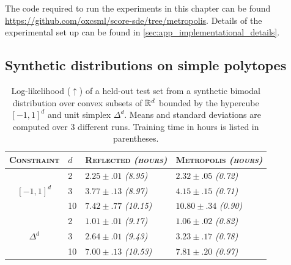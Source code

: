 The code required to run the experiments in this chapter can be found \url{https://github.com/oxcsml/score-sde/tree/metropolis}.
Details of the experimental set up can be found in \cref{sec:app_implementational_details}.

\subsection{Synthetic distributions on simple polytopes}
\label{sec:exp_synthetic_tasks}

\begin{table}
	\caption{
		Log-likelihood (\(\uparrow\)) of a held-out test set from a synthetic bimodal distribution over convex subsets of \(\mathbb{R}^d\) bounded by the hypercube \([-1,1]^d\) and unit simplex \(\Delta^d\).
		Means and standard deviations are computed over 3 different runs.
		Training time in hours is listed in parentheses.
	}
	\label{tab:synthetic_polytope_dupref}
	\centering

	\begin{tabular}{clll}
		\toprule
		\scshape Constraint & \(d\) & {\scshape Reflected \emph{(hours)}}    & {\scshape Metropolis \emph{(hours)}}              \\
		\midrule
		\multirow{3}{*}{\([-1,1]^d\)}
		           & 2     & \(2.25\pm{.01}\) \emph{(8.95)}  & \(\mathbf{2.32\pm{.05}}\) \emph{(0.72)}    \\
		           & 3     & \(3.77\pm{.13}\) \emph{(8.97)}  & \(\mathbf{4.15\pm{.15}}\) \emph{(0.71)}    \\
		           & 10    & \(7.42\pm{.77}\) \emph{(10.15)} & \(\mathbf{10.80 \pm{.34 }}\) \emph{(0.90)} \\
		\midrule
		\multirow{3}{*}{\(\Delta^d\)}
		           & 2     & \(1.01 \pm{.01}\) \emph{(9.17)} & \(\mathbf{1.06\pm{.02}}\) \emph{(0.82)}    \\
		           & 3     & \(2.64\pm{.01}\) \emph{(9.43)}  & \(\mathbf{3.23\pm{.17}}\)  \emph{(0.78)}   \\
		           & 10    & \(7.00\pm{.13}\) \emph{(10.53)} & \(\mathbf{7.81\pm{.20}}\) \emph{(0.97)}    \\
		\bottomrule
	\end{tabular}
\end{table}

